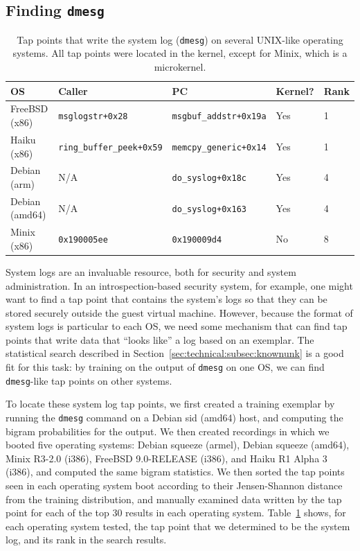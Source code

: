 \subsection{Finding \large \texttt{dmesg}}
\label{sec:eval:subsec:dmesg}

\begin{table}
    \centering
    \small
    \begin{tabular}{|l|l|l|l|l|}
        \hline
        OS & Caller & PC & Kernel? & Rank \\
        \hline
        FreeBSD (x86) & \texttt{msglogstr+0x28} & \texttt{msgbuf\_addstr+0x19a} & Yes & 1 \\
        Haiku (x86) & \texttt{ring\_buffer\_peek+0x59} & \texttt{memcpy\_generic+0x14} & Yes & 1 \\
        Debian (arm) & N/A & \texttt{do\_syslog+0x18c} & Yes & 4 \\
        Debian (amd64) & N/A & \texttt{do\_syslog+0x163} & Yes & 4 \\ 
        Minix (x86) & \texttt{0x190005ee} & \texttt{0x190009d4} & No & 8 \\
        \hline
    \end{tabular}
\caption{Tap points that write the system log (\texttt{dmesg}) on
several UNIX-like operating systems. All tap points were located in the
kernel, except for Minix, which is a microkernel.}
\label{tbl:dmesg}
\end{table}

System logs are an invaluable resource, both for security and system
administration. In an introspection-based security system, for example,
one might want to find a tap point that contains the system's logs so
that they can be stored securely outside the guest virtual machine.
However, because the format of system logs is particular to each OS, we
need some mechanism that can find tap points that write data that
``looks like'' a log based on an exemplar. The statistical search
described in Section~\ref{sec:technical:subsec:knownunk} is a good fit
for this task: by training on the output of \texttt{dmesg} on one
OS, we can find \texttt{dmesg}-like tap points on other systems.

To locate these system log tap points, we first created a training
exemplar by running the \texttt{dmesg} command on a Debian sid (amd64)
host, and computing the bigram probabilities for the output. We then
created recordings in which we booted five operating systems: Debian
squeeze (armel), Debian squeeze (amd64), Minix R3-2.0 (i386), FreeBSD
9.0-RELEASE (i386), and Haiku R1 Alpha 3 (i386), and computed the same
bigram statistics. We then sorted the tap points seen in each operating
system boot according to their Jensen-Shannon distance from the training
distribution, and manually examined data written by the tap point for
each of the top 30 results in each operating system. Table~\ref{tbl:dmesg}
shows, for each operating system tested, the tap point that we determined to be
the system log, and its rank in the search results.


